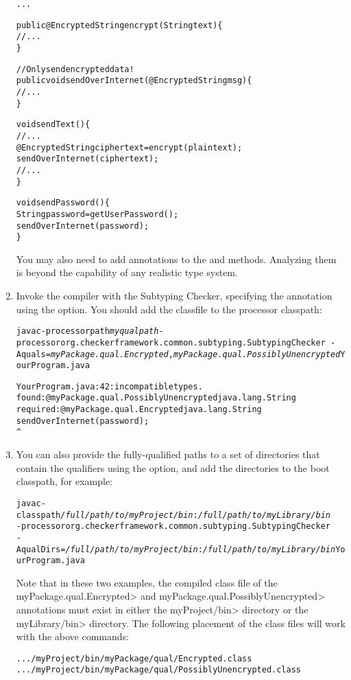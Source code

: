 \begin{enumerate}
\begin{alltt}
...

public @Encrypted String encrypt(String text) \{
    // ...
\}

// Only send encrypted data!
public void sendOverInternet(@Encrypted String msg) \{
    // ...
\}

void sendText() \{
    // ...
    @Encrypted String ciphertext = encrypt(plaintext);
    sendOverInternet(ciphertext);
    // ...
\}

void sendPassword() \{
    String password = getUserPassword();
    sendOverInternet(password);
\}
\end{alltt}

You may also need to add  annotations to the
 and  methods.  Analyzing them is beyond the
capability of any realistic type system.

\item
  Invoke the compiler with the Subtyping Checker, specifying the
   annotation using the  option.
  You should add the  classfile to the processor classpath:

\begin{alltt}
  javac -processorpath \textit{myqualpath} -processor org.checkerframework.common.subtyping.SubtypingChecker \
        -Aquals=\textit{myPackage.qual.Encrypted},\textit{myPackage.qual.PossiblyUnencrypted} YourProgram.java

YourProgram.java:42: incompatible types.
found   : @myPackage.qual.PossiblyUnencrypted java.lang.String
required: @myPackage.qual.Encrypted java.lang.String
    sendOverInternet(password);
                     ^
\end{alltt}

\item
You can also provide the fully-qualified paths to a set of directories
that contain the qualifiers using the \code{-AqualDirs} option, and add
the directories to the boot classpath, for example:

\begin{alltt}
  javac -classpath \textit{/full/path/to/myProject/bin}:\textit{/full/path/to/myLibrary/bin} \ttbs
        -processor org.checkerframework.common.subtyping.SubtypingChecker \ttbs
        -AqualDirs=\textit{/full/path/to/myProject/bin}:\textit{/full/path/to/myLibrary/bin} YourProgram.java
\end{alltt}

\begin{sloppypar}
Note that in these two examples, the compiled class file of the
\<myPackage.qual.Encrypted> and \<myPackage.qual.PossiblyUnencrypted> annotations
must exist in either the \<myProject/bin> directory or the \<myLibrary/bin>
directory. The following placement of the class files will work with the above
commands:
\end{sloppypar}

\begin{alltt}
  .../myProject/bin/myPackage/qual/Encrypted.class
  .../myProject/bin/myPackage/qual/PossiblyUnencrypted.class
\end{alltt}

\end{enumerate}

